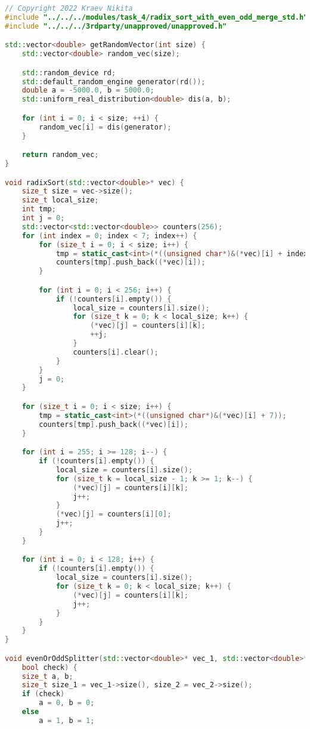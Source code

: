 \documentclass{report}
\begin{document}
\begin{lstlisting}[language=C++]
// Copyright 2022 Kraev Nikita
#include "../../../modules/task_4/radix_sort_with_even_odd_merge_std.h"
#include "../../../3rdparty/unapproved/unapproved.h"

std::vector<double> getRandomVector(int size) {
    std::vector<double> random_vec(size);

    std::random_device rd;
    std::default_random_engine generator(rd());
    double a = -5000.0, b = 5000.0;
    std::uniform_real_distribution<double> dis(a, b);

    for (int i = 0; i < size; ++i) {
        random_vec[i] = dis(generator);
    }

    return random_vec;
}

void radixSort(std::vector<double>* vec) {
    size_t size = vec->size();
    size_t local_size;
    int tmp;
    int j = 0;
    std::vector<std::vector<double>> counters(256);
    for (int index = 0; index < 7; index++) {
        for (size_t i = 0; i < size; i++) {
            tmp = static_cast<int>(*((unsigned char*)&(*vec)[i] + index));
            counters[tmp].push_back((*vec)[i]);
        }

        for (int i = 0; i < 256; i++) {
            if (!counters[i].empty()) {
                local_size = counters[i].size();
                for (size_t k = 0; k < local_size; k++) {
                    (*vec)[j] = counters[i][k];
                    ++j;
                }
                counters[i].clear();
            }
        }
        j = 0;
    }

    for (size_t i = 0; i < size; i++) {
        tmp = static_cast<int>(*((unsigned char*)&(*vec)[i] + 7));
        counters[tmp].push_back((*vec)[i]);
    }

    for (int i = 255; i >= 128; i--) {
        if (!counters[i].empty()) {
            local_size = counters[i].size();
            for (size_t k = local_size - 1; k >= 1; k--) {
                (*vec)[j] = counters[i][k];
                j++;
            }
            (*vec)[j] = counters[i][0];
            j++;
        }
    }

    for (int i = 0; i < 128; i++) {
        if (!counters[i].empty()) {
            local_size = counters[i].size();
            for (size_t k = 0; k < local_size; k++) {
                (*vec)[j] = counters[i][k];
                j++;
            }
        }
    }
}

void evenOrOddSplitter(std::vector<double>* vec_1, std::vector<double>* vec_2,
    bool check) {
    size_t a, b;
    size_t size_1 = vec_1->size(), size_2 = vec_2->size();
    if (check)
        a = 0, b = 0;
    else
        a = 1, b = 1;


\end{lstlisting}
\end{document}
